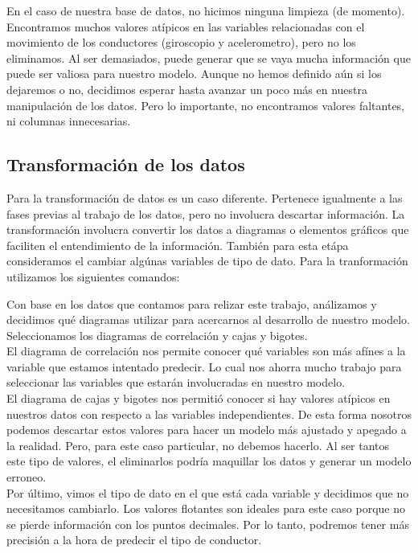 \documentclass{article}
\begin{document}
        En el caso de nuestra base de datos, no hicimos ninguna limpieza (de momento). Encontramos muchos valores atípicos en las variables relacionadas con el movimiento de los conductores (giroscopio y acelerometro), pero no los eliminamos. Al ser demasiados, puede generar que se vaya mucha información que puede ser valiosa para nuestro modelo. Aunque no hemos definido aún si los dejaremos o no, decidimos esperar hasta avanzar un poco más en nuestra manipulación de los datos. Pero lo importante, no encontramos valores faltantes, ni columnas innecesarias.
    
    \subsection{Transformación de los datos}

        Para la transformación de datos es un caso diferente. Pertenece igualmente a las fases previas al trabajo de los datos, pero no involucra descartar información. La transformación involucra convertir los datos a diagramas o elementos gráficos que faciliten el entendimiento de la información. También para esta etápa consideramos el cambiar algúnas variables de tipo de dato. Para la tranformación utilizamos los siguientes comandos:

        Con base en los datos que contamos para relizar este trabajo, análizamos y decidimos qué diagramas utilizar para acercarnos al desarrollo de nuestro modelo. Seleccionamos los diagramas de correlación y cajas y bigotes. \\
        El diagrama de correlación nos permite conocer qué variables son más afínes a la variable que estamos intentado predecir. Lo cual nos ahorra mucho trabajo para seleccionar las variables que estarán involucradas en nuestro modelo. \\
        El diagrama de cajas y bigotes nos permitió conocer si hay valores atípicos en nuestros datos con respecto a las variables independientes. De esta forma nosotros podemos descartar estos valores para hacer un modelo más ajustado y apegado a la realidad. Pero, para este caso particular, no debemos hacerlo. Al ser tantos este tipo de valores, el eliminarlos podría maquillar los datos y generar un modelo erroneo.\\
        Por último, vimos el tipo de dato en el que está cada variable y decidimos que no necesitamos cambiarlo. Los valores flotantes son ideales para este caso porque no se pierde información con los puntos decimales. Por lo tanto, podremos tener más precisión a la hora de predecir el tipo de conductor.
\end{document}
